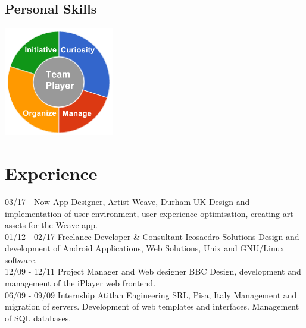 \documentclass[]{friggeri-cv}
\begin{document}
\begin{aside}
  \section{Personal Skills}
    \includegraphics[scale=0.62]{img/personal.png}
    ~
\end{aside}

\section{Experience}
\begin{entrylist}
  \entry
    {03/17 - Now}
    {App Designer, Artist}
    {Weave, Durham UK}
    {Design and implementation of user environment, user experience optimisation, creating art assets for the Weave app.\\}
  \entry
    {01/12 - 02/17}
    {Freelance Developer \& Consultant}
    {Icosaedro Solutions}
    {Design and development of Android Applications, Web Solutions, Unix and GNU/Linux software.\\}
    \entry
    {12/09 - 12/11}
    {Project Manager and Web designer}
    {BBC}
    {Design, development and management of the iPlayer web frontend.\\}
    \entry
    {06/09 - 09/09}
    {Internship}
    {Atitlan Engineering SRL, Pisa, Italy}
    {Management and migration of servers. Development of web templates and interfaces. Management of SQL databases.}
\end{entrylist}
\end{document}
